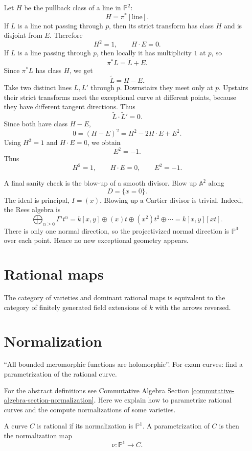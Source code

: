 \medskip\noindent
Let $H$ be the pullback class of a line in
$\mathbb{P}^2$:
$$
H=\pi^*[\text{line}].
$$
If $L$ is a line not passing through $p$, then its
strict transform has class $H$ and is disjoint from
$E$.
Therefore
$$
H^2=1,
\qquad
H\cdot E=0.
$$
If $L$ is a line passing through $p$, then locally it
has multiplicity $1$ at $p$, so
$$
\pi^*L=\widetilde L+E.
$$
Since $\pi^*L$ has class $H$, we get
$$
\widetilde L=H-E.
$$
Take two distinct lines $L,L'$ through $p$. Downstairs
they meet only at $p$. Upstairs their strict transforms
meet the exceptional curve at different points,
because they have different tangent directions.
Thus
$$
\widetilde L\cdot \widetilde L'=0.
$$
Since both have class $H-E$,
$$
0=(H-E)^2=H^2-2H\cdot E+E^2.
$$
Using $H^2=1$ and $H\cdot E=0$, we obtain
$$
E^2=-1.
$$
Thus
$$
H^2=1,
\qquad
H\cdot E=0,
\qquad
E^2=-1.
$$

\medskip\noindent
A final sanity check is the blow-up of a smooth
divisor. Blow up $\mathbb{A}^2$ along
$$
D=\{x=0\}.
$$
The ideal is principal, $I=(x)$. Blowing up a
Cartier divisor is trivial. Indeed, the Rees algebra is
$$
\bigoplus_{n\geq 0}I^nt^n
=
k[x,y]\oplus (x)t\oplus (x^2)t^2\oplus\cdots
=
k[x,y][xt].
$$
There is only one normal direction, so the
projectivized normal direction is $\mathbb{P}^0$ over
each point. Hence no new exceptional geometry appears.

\section{Rational maps}
\label{section-rational-maps}

\noindent
The category of varieties and dominant
rational maps is equivalent to the category
of finitely generated field extensions of $k$
with the arrows reversed.

\section{Normalization}
\label{section-normalization}

\noindent
``All bounded meromorphic functions are
holomorphic''. For exam curves:
find a parametrization of the rational curve.

For the abstract definitions see
Commutative Algebra Section
\ref{commutative-algebra-section-normalization}.
Here we explain how to
parametrize rational curves
and the compute normalizations of some
varieties.

A curve $C$ is rational if its
normalization is $\mathbb P^1$.
A parametrization of $C$ is then the
normalization map
$$
  \nu:\mathbb P^1\to C.
$$

